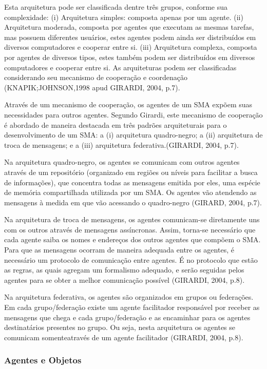  Esta arquitetura pode ser classificada dentre três grupos, conforme sua complexidade: (i) Arquitetura simples: composta apenas por um agente. (ii) Arquitetura moderada, composta por agentes que executam as mesmas tarefas, mas possuem diferentes usuários, estes agentes podem ainda ser distribuídos em diversos computadores e cooperar entre si. (iii) Arquitetura complexa, composta por agentes de diversos tipos, estes também podem ser distribuídos em diversos computadores e cooperar entre si. As arquiteturas podem ser classificadas considerando seu mecanismo de cooperação e coordenação (KNAPIK;JOHNSON,1998 apud GIRARDI, 2004, p.7).

Através de um mecanismo de cooperação, os agentes de um SMA expõem suas necessidades para outros agentes. Segundo Girardi, este mecanismo de cooperação é abordado de maneira destacada em três padrões arquiteturais para o desenvolvimento de um SMA: a (i) arquitetura quadro-negro; a (ii) arquitetura de troca de mensagens; e a (iii) arquitetura federativa.(GIRARDI, 2004, p.7). 

Na arquitetura quadro-negro, os agentes se comunicam com outros agentes através de um repositório (organizado em regiões ou níveis para facilitar a busca de informações), que concentra todas as mensagens emitida por eles, uma espécie de memória compartilhada utilizada por um SMA. Os agentes vão atendendo as mensagens à medida em que vão acessando o quadro-negro (GIRARD, 2004, p.7).

Na arquitetura de troca de mensagens, os agentes comunicam-se diretamente uns com os outros através de mensagens assíncronas. Assim, torna-se necessário que cada agente saiba os nomes e endereços dos outros agentes que compõem o SMA. Para que as mensagens ocorram de maneira adequada entre os agentes, é necessário um protocolo de comunicação entre agentes. É no protocolo que estão as regras, as quais agregam um formalismo adequado, e serão seguidas pelos agentes para se obter a melhor comunicação possível (GIRARDI, 2004, p.8).

Na arquitetura federativa, os agentes são organizados em grupos ou federações. Em cada grupo/federação existe um agente facilitador responsável por receber as mensagens que chega e cada grupo/federação e as encaminhar para os agentes destinatários presentes no grupo. Ou seja, nesta arquitetura os agentes se comunicam somenteatravés de um agente facilitador (GIRARDI, 2004, p.8).


\subsubsection{Agentes e Objetos}

